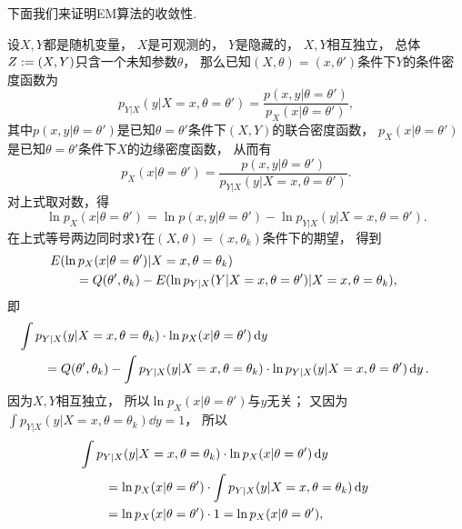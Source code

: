 下面我们来证明EM算法的收敛性.

设\(X,Y\)都是随机变量，
\(X\)是可观测的，
\(Y\)是隐藏的，
\(X,Y\)相互独立，
总体\(Z := (X,Y)\)只含一个未知参数\(\theta\)，
那么已知\((X,\theta) = (x,\theta')\)条件下\(Y\)的条件密度函数为\begin{equation*}
	p_{Y \vert X}(y \vert X=x, \theta=\theta')
	= \frac{p(x,y \vert \theta=\theta')}{p_X(x \vert \theta=\theta')},
\end{equation*}
其中\(p(x,y \vert \theta=\theta')\)是已知\(\theta = \theta'\)条件下\((X,Y)\)的联合密度函数，
\(p_X(x \vert \theta=\theta')\)是已知\(\theta = \theta'\)条件下\(X\)的边缘密度函数，
从而有\begin{equation*}
	p_X(x \vert \theta=\theta')
	= \frac{p(x,y \vert \theta=\theta')}{p_{Y \vert X}(y \vert X=x, \theta=\theta')}.
\end{equation*}
对上式取对数，得\begin{equation*}%
	\ln p_X(x \vert \theta=\theta')
	= \ln p(x,y \vert \theta=\theta')
	- \ln p_{Y \vert X}(y \vert X=x, \theta=\theta').
\end{equation*}
在上式等号两边同时求\(Y\)在\((X,\theta) = (x,\theta_k)\)条件下的期望，
得到\begin{align*}
	&\hspace{-20pt}
	E(\ln p_X(x \vert \theta=\theta') \vert X=x, \theta=\theta_k) \\
	&= Q(\theta',\theta_k)
	- E(\ln p_{Y \vert X}(Y \vert X=x, \theta=\theta') \vert X=x, \theta=\theta_k),
\end{align*}
即\begin{align*}
	&\hspace{-20pt}
	\int p_{Y \vert X}(y \vert X=x, \theta=\theta_k) \cdot \ln p_X(x \vert \theta=\theta') \dd{y} \\
	&= Q(\theta',\theta_k)
	- \int p_{Y \vert X}(y \vert X=x, \theta=\theta_k) \cdot \ln p_{Y \vert X}(y \vert X=x, \theta=\theta') \dd{y}.
\end{align*}
因为\(X,Y\)相互独立，
所以\(\ln p_X(x \vert \theta=\theta')\)与\(y\)无关；
又因为\(\int p_{Y \vert X}(y \vert X=x, \theta=\theta_k) \dd{y} = 1\)，
所以\begin{align*}
	&\hspace{-20pt}
	\int p_{Y \vert X}(y \vert X=x, \theta=\theta_k) \cdot \ln p_X(x \vert \theta=\theta') \dd{y} \\
	&= \ln p_X(x \vert \theta=\theta') \cdot \int p_{Y \vert X}(y \vert X=x, \theta=\theta_k) \dd{y} \\
	&= \ln p_X(x \vert \theta=\theta') \cdot 1
	= \ln p_X(x \vert \theta=\theta'),
\end{align*}
